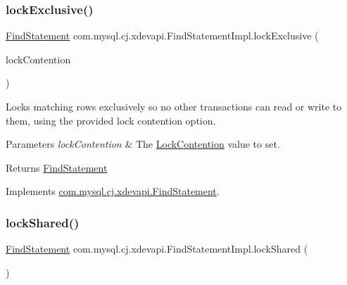 \subsubsection{\texorpdfstring{lock\+Exclusive()}{lockExclusive()}\hspace{0.1cm}{\footnotesize\ttfamily [2/2]}}
{\footnotesize\ttfamily \mbox{\hyperlink{interfacecom_1_1mysql_1_1cj_1_1xdevapi_1_1_find_statement}{Find\+Statement}} com.\+mysql.\+cj.\+xdevapi.\+Find\+Statement\+Impl.\+lock\+Exclusive (\begin{DoxyParamCaption}\item[{Lock\+Contention}]{lock\+Contention }\end{DoxyParamCaption})}

Locks matching rows exclusively so no other transactions can read or write to them, using the provided lock contention option.


\begin{DoxyParams}{Parameters}
{\em lock\+Contention} & The \mbox{\hyperlink{}{Lock\+Contention}} value to set. \\
\hline
\end{DoxyParams}
\begin{DoxyReturn}{Returns}
\mbox{\hyperlink{interfacecom_1_1mysql_1_1cj_1_1xdevapi_1_1_find_statement}{Find\+Statement}} 
\end{DoxyReturn}


Implements \mbox{\hyperlink{interfacecom_1_1mysql_1_1cj_1_1xdevapi_1_1_find_statement_a45a87d77da29808cb82617f003de584d}{com.\+mysql.\+cj.\+xdevapi.\+Find\+Statement}}.

\mbox{\label{classcom_1_1mysql_1_1cj_1_1xdevapi_1_1_find_statement_impl_acdc867ddce32e3776d059f72a601fbdd}} 
\subsubsection{\texorpdfstring{lock\+Shared()}{lockShared()}\hspace{0.1cm}{\footnotesize\ttfamily [1/2]}}
{\footnotesize\ttfamily \mbox{\hyperlink{interfacecom_1_1mysql_1_1cj_1_1xdevapi_1_1_find_statement}{Find\+Statement}} com.\+mysql.\+cj.\+xdevapi.\+Find\+Statement\+Impl.\+lock\+Shared (\begin{DoxyParamCaption}{ }\end{DoxyParamCaption})}

